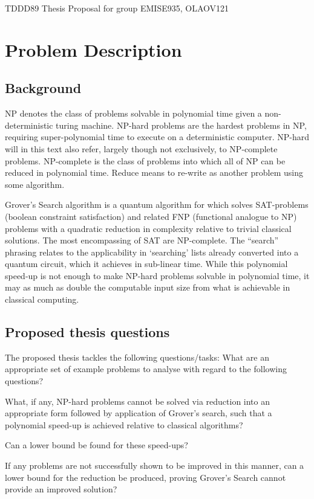 \documentclass[msc,lith,english]{liuthesis}
\author{\parbox{\textwidth}{Emil Segerbäck\\ Olav Övrebö}}
\begin{document}
TDDD89 Thesis Proposal for group EMISE935, OLAOV121

\section{Problem Description}
\subsection{Background}
NP denotes the class of problems solvable in polynomial time given a non-deterministic turing machine. NP-hard problems are the hardest problems in NP, requiring super-polynomial time to execute on a deterministic computer. NP-hard will in this text also refer, largely though not exclusively, to NP-complete problems. NP-complete is the class of problems into which all of NP can be reduced in polynomial time. Reduce means to re-write as another problem using some algorithm.

Grover’s Search algorithm is a quantum algorithm for which solves SAT-problems (boolean constraint satisfaction) and related FNP (functional analogue to NP) problems with a quadratic reduction in complexity relative to trivial classical solutions. The most encompassing of SAT are NP-complete. The “search” phrasing relates to the applicability in ‘searching’ lists already converted into a quantum circuit, which it achieves in sub-linear time. While this polynomial speed-up is not enough to make NP-hard problems solvable in polynomial time, it may as much as double the computable input size from what is achievable in classical computing.

\subsection{Proposed thesis questions}
The proposed thesis tackles the following questions/tasks:
What are an appropriate set of example problems to analyse with regard to the following questions?

What, if any, NP-hard problems cannot be solved via reduction into an appropriate form followed by application of Grover’s search, such that a polynomial speed-up is achieved relative to classical algorithms?

Can a lower bound be found for these speed-ups?

If any problems are not successfully shown to be improved in this manner, can a lower bound for the reduction be produced, proving Grover’s Search cannot provide an improved solution?
\end{document}
